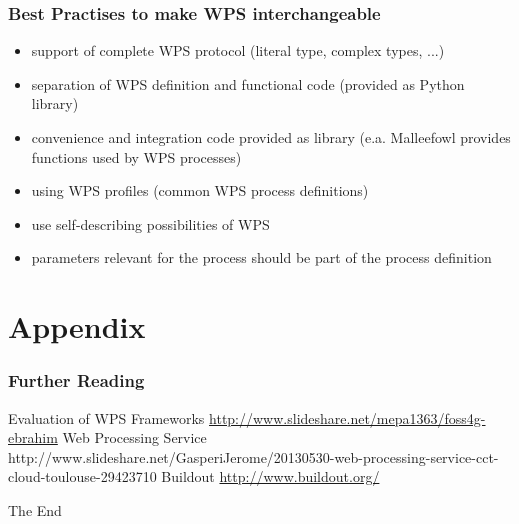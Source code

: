 \documentclass{beamer}
\begin{document}
  \begin{frame}
    \frametitle{Best Practises to make WPS interchangeable}
    \begin{itemize}
      \item support of complete WPS protocol (literal type, complex types, ...)
      \item separation of WPS definition and functional code (provided as Python library)
      \item convenience and integration code provided as library (e.a. Malleefowl provides functions used by WPS processes)
      \item using WPS profiles (common WPS process definitions)
      \item use self-describing possibilities of WPS
      \item parameters relevant for the process should be part of the process definition
    \end{itemize}
  \end{frame}


  \appendix

  \section{Appendix}
  
   \begin{frame}[allowframebreaks]
    \frametitle<presentation>{Further Reading}    
    \begin{thebibliography}{10}    
      \beamertemplatearticlebibitems
      Evaluation of WPS Frameworks
      \newblock \url{http://www.slideshare.net/mepa1363/foss4g-ebrahim}
      Web Processing Service
      \newblock http://www.slideshare.net/GasperiJerome/20130530-web-processing-service-cct-cloud-toulouse-29423710
      Buildout
      \newblock \url{http://www.buildout.org/}
    \end{thebibliography}
    
  \end{frame}
  

  \begin{frame}
    \Huge{\centerline{The End}}
  \end{frame}

\end{document}
